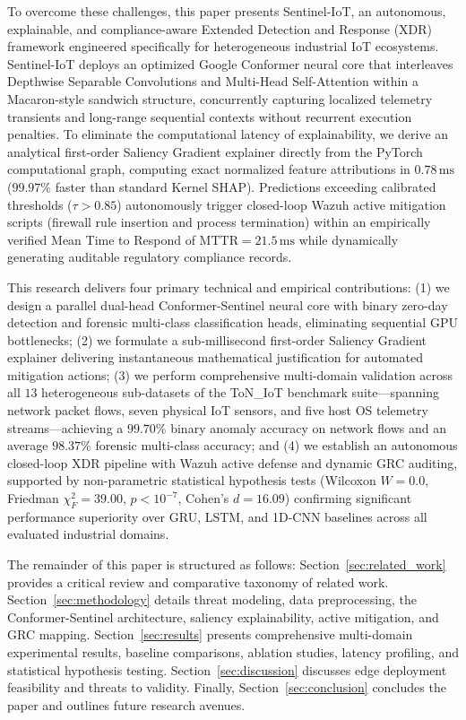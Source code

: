 \documentclass[11pt,a4paper]{article}
\begin{document}
To overcome these challenges, this paper presents Sentinel-IoT, an autonomous, explainable, and compliance-aware Extended Detection and Response (XDR) framework engineered specifically for heterogeneous industrial IoT ecosystems. Sentinel-IoT deploys an optimized Google Conformer neural core \cite{gulati2020conformer, netpacketformer2025} that interleaves Depthwise Separable Convolutions and Multi-Head Self-Attention within a Macaron-style sandwich structure, concurrently capturing localized telemetry transients and long-range sequential contexts without recurrent execution penalties. To eliminate the computational latency of explainability, we derive an analytical first-order Saliency Gradient explainer directly from the PyTorch computational graph, computing exact normalized feature attributions in $0.78\,\text{ms}$ ($99.97\%$ faster than standard Kernel SHAP). Predictions exceeding calibrated thresholds ($\tau > 0.85$) autonomously trigger closed-loop Wazuh active mitigation scripts (firewall rule insertion and process termination) within an empirically verified Mean Time to Respond of $\text{MTTR} = 21.5\,\text{ms}$ while dynamically generating auditable regulatory compliance records.

This research delivers four primary technical and empirical contributions: (1) we design a parallel dual-head Conformer-Sentinel neural core with binary zero-day detection and forensic multi-class classification heads, eliminating sequential GPU bottlenecks; (2) we formulate a sub-millisecond first-order Saliency Gradient explainer delivering instantaneous mathematical justification for automated mitigation actions; (3) we perform comprehensive multi-domain validation across all $13$ heterogeneous sub-datasets of the ToN\_IoT benchmark suite—spanning network packet flows, seven physical IoT sensors, and five host OS telemetry streams—achieving a $99.70\%$ binary anomaly accuracy on network flows and an average $98.37\%$ forensic multi-class accuracy; and (4) we establish an autonomous closed-loop XDR pipeline with Wazuh active defense and dynamic GRC auditing, supported by non-parametric statistical hypothesis tests (Wilcoxon $W=0.0$, Friedman $\chi_F^2 = 39.00$, $p < 10^{-7}$, Cohen's $d = 16.09$) confirming significant performance superiority over GRU, LSTM, and 1D-CNN baselines across all evaluated industrial domains.

The remainder of this paper is structured as follows: Section~\ref{sec:related_work} provides a critical review and comparative taxonomy of related work. Section~\ref{sec:methodology} details threat modeling, data preprocessing, the Conformer-Sentinel architecture, saliency explainability, active mitigation, and GRC mapping. Section~\ref{sec:results} presents comprehensive multi-domain experimental results, baseline comparisons, ablation studies, latency profiling, and statistical hypothesis testing. Section~\ref{sec:discussion} discusses edge deployment feasibility and threats to validity. Finally, Section~\ref{sec:conclusion} concludes the paper and outlines future research avenues.
\end{document}
